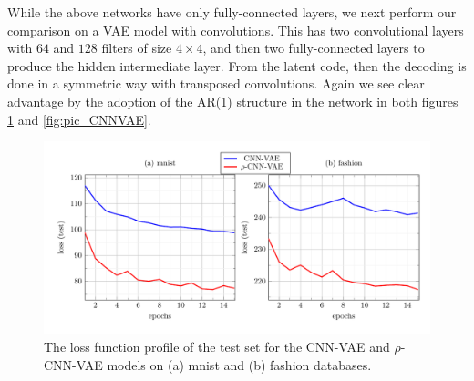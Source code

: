 \documentclass{article}
\begin{document}
While the above networks have only fully-connected layers, we next perform our comparison on a VAE model with convolutions. This has two convolutional layers with $64$ and $128$ filters of size $4 \times 4 $, and then two fully-connected layers to produce the hidden intermediate layer. From the latent code, then the decoding is done in a symmetric way with transposed convolutions. Again we see clear advantage by the adoption of the AR(1) structure in the network in both figures \ref{fig:curve_CNNVAE} and \ref{fig:pic_CNNVAE}. 


 \begin{figure}  [!h]
   \begin{center} 
\includegraphics[width=1.0\textwidth]{figs/curves/CNN_VAE.pdf}
\end{center}
\vspace{-.75cm}   
   \caption{The loss function profile of the test set for the CNN-VAE and $\rho$-CNN-VAE models on (a) mnist and (b) fashion databases.}
   \label{fig:curve_CNNVAE}
   \end{figure}
\end{document}

